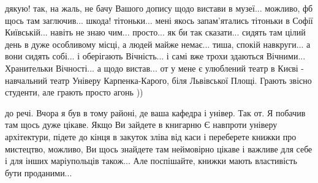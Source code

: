 дякую! так, на жаль, не бачу Вашого допису щодо вистави в музеї... можливо, фб
щось там заглючив... шкода! тітоньки... мені якось запам'ятались тітоньки в
Софії Київській... навіть не знаю чим... просто... як би так сказати... сидять
там цілий день в дуже особливому місці, а людей майже немає... тиша, спокій
навкруги... а вони сидять собі... і оберігають Вічність... і самі вже трохи
здаються Вічними... Хранительки Вічності... а щодо вистав... от у мене є
улюблений театр в Києві - навчальний театр Універу Карпенка-Карого, біля
Львівської Площі. Грають звісно студенти, але грають просто агонь ))

до речі. Вчора я був в тому районі, де ваша кафедра і універ. Так от. Я побачив
там щось дуже цікаве. Якщо Ви зайдете в книгарню Є навпроти універу
архітектури, підете до кінця в закуток зліва від каси і переберете книжки про
мистецтво, можливо, Ви щось знайдете там неймовірно цікаве і важливе для себе і
для інших маріупольців також...  Але поспішайте, книжки мають властивість бути
проданими...
